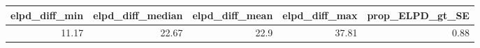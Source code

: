 \begin{table}[!h]
\centering
\begin{tabular}{rrrrr}
\toprule
elpd\_diff\_min & elpd\_diff\_median & elpd\_diff\_mean & elpd\_diff\_max & prop\_ELPD\_gt\_SE\\
\midrule
11.17 & 22.67 & 22.9 & 37.81 & 0.88\\
\bottomrule
\end{tabular}
\end{table}
